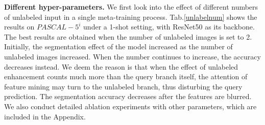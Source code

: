 \documentclass[letterpaper]{article} %
\begin{document}
\begin{table}[!t]
\centering
\begin{threeparttable}
\end{threeparttable}
\caption{Ablation studies on the unlabeled branch. ``w/ guide'' refers to the use of query local prototypes in the unlabeled branch for guidance, while ``w/o guide'' means using prototypes generated from the unlabeled branch itself.}
\label{design2}
\end{table}

\begin{table}[!t]
\centering
\begin{threeparttable}
\end{threeparttable}
\caption{Ablation studies of different numbers of unlabeled images in the single meta-training process.}
\label{unlabelnum}
\end{table}

\textbf{Different hyper-parameters.} We first look into the effect of different numbers of unlabeled input in a single meta-training process. Tab.\ref{unlabelnum} shows the results on $PASCAL-5^i$ under a 1-shot setting, with ResNet50 as its backbone. The best results are obtained when the number of unlabeled images is set to 2. Initially, the segmentation effect of the model increased as the number of unlabeled images increased. When the number continues to increase, the accuracy decreases instead. We deem the reason is that when the effect of unlabeled enhancement counts much more than the query branch itself, the attention of feature mining may turn to the unlabeled branch, thus disturbing the query prediction. The segmentation accuracy decreases after the features are blurred. We also conduct detailed ablation experiments with other parameters, which are included in the Appendix.
\end{document}
